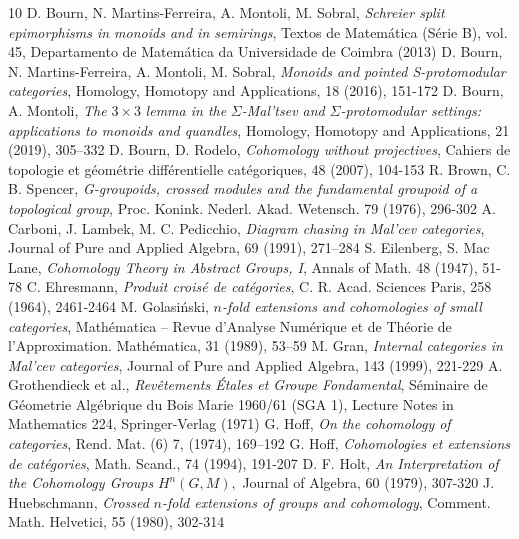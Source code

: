 \documentclass[11pt]{amsart}
\theoremstyle{plain}
\theoremstyle{definition}
\theoremstyle{remark}
\begin{document}
\begin{thebibliography}{10}
 D. Bourn, N. Martins-Ferreira, A. Montoli, M. Sobral, \emph{Schreier split epimorphisms in monoids and in semirings}, Textos de Matemática (Série B), vol. 45, Departamento de Matemática da Universidade de Coimbra (2013)
  D. Bourn, N. Martins-Ferreira, A. Montoli, M. Sobral, \emph{Monoids and pointed S-protomodular categories}, Homology, Homotopy and Applications, 18 (2016), 151-172
 D. Bourn, A. Montoli, \emph{The }$3\times3$ \emph{lemma in the} $\Sigma$\emph{-Mal’tsev
and} $\Sigma$\emph{-protomodular settings: applications to monoids and quandles}, Homology,
Homotopy and Applications, 21 (2019), 305–332
 D. Bourn, D. Rodelo, \emph{Cohomology without projectives}, Cahiers de topologie et géométrie différentielle catégoriques, 48 (2007), 104-153
 R. Brown, C. B. Spencer, \emph{G-groupoids, crossed modules and the
fundamental groupoid of a topological group}, Proc. Konink. Nederl. Akad.
Wetensch. 79 (1976), 296-302
 A. Carboni, J. Lambek, M. C. Pedicchio, \emph{Diagram chasing in Mal’cev categories}, Journal of Pure and Applied Algebra, 69 (1991), 271–284
 S. Eilenberg, S. Mac Lane, \emph{Cohomology Theory in Abstract Groups, I}, Annals of Math. 48 (1947), 51-78
 C. Ehresmann, \emph{Produit croisé de catégories}, C. R. Acad. Sciences Paris, 258 (1964), 2461-2464
 M. Golasiński, $n$\emph{-fold extensions and cohomologies of small categories},
Mathématica – Revue d’Analyse Numérique et de Théorie de
l’Approximation. Mathématica, 31 (1989), 53–59
 M. Gran, \emph{Internal categories in Mal'cev categories}, Journal of Pure and Applied Algebra, 143 (1999), 221-229
 A. Grothendieck et al., \emph{Revêtements Étales et Groupe Fondamental}, Séminaire de Géometrie Algébrique du Bois Marie 1960/61 (SGA 1), Lecture Notes in Mathematics 224, Springer-Verlag (1971)
 G. Hoff, \emph{On the cohomology of categories}, Rend. Mat. (6) 7, (1974), 169–192
 G. Hoff, \emph{Cohomologies et extensions de catégories}, Math. Scand., 74 (1994), 191-207
 D. F. Holt, \emph{An Interpretation of the Cohomology Groups} $H^n(G,M),$ Journal of Algebra, 60 (1979), 307-320
 J. Huebschmann, \emph{Crossed} $n$\emph{-fold extensions of groups and cohomology}, Comment. Math. Helvetici, 55 (1980), 302-314

\end{thebibliography}
\end{document}
